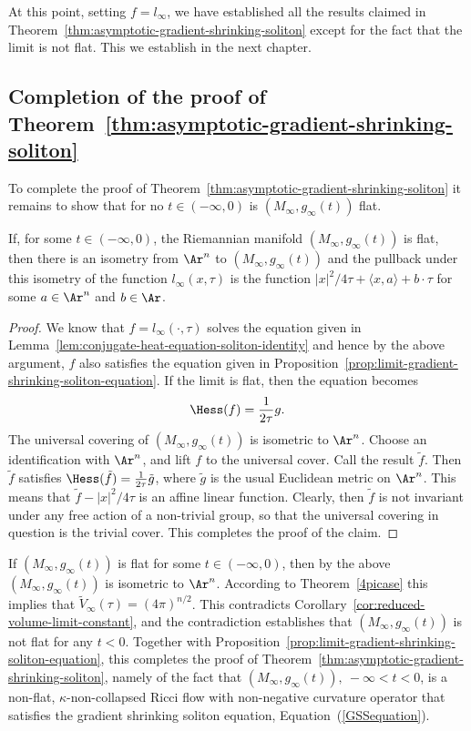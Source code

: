 At this point, setting $f=l_\infty$, we have established all the
results claimed in Theorem~\ref{thm:asymptotic-gradient-shrinking-soliton} except for the fact that
the limit is not flat. This we establish in the next chapter.


\subsection{Completion of the proof of
Theorem~{\ref{thm:asymptotic-gradient-shrinking-soliton}}}

 To complete the
proof of Theorem~\ref{thm:asymptotic-gradient-shrinking-soliton} it remains to show that for no $t\in
(-\infty,0)$ is $(M_\infty,g_\infty(t))$ flat.

\begin{claim}\label{claim:flat-limit-length-function-form}
If, for some $t\in (-\infty,0)$, the Riemannian manifold
$(M_\infty,g_\infty(t))$ is flat, then there is an isometry from
$\Ar^n$ to $(M_\infty,g_\infty(t))$  and the pullback under this
isometry of the function $l_\infty(x,\tau)$ is the function
$|x|^2/4\tau+\langle x,a\rangle+b\cdot \tau$ for some $a\in \Ar^n$
and $b\in \Ar$.
\end{claim}

\begin{proof}
We know that $f=l_\infty(\cdot,\tau)$ solves the equation given in
Lemma~\ref{lem:conjugate-heat-equation-soliton-identity} and hence by the above argument, $f$ also satisfies
the equation given in  Proposition~\ref{prop:limit-gradient-shrinking-soliton-equation}. If the limit is
flat, then the equation becomes
$$\Hess(f)=\frac{1}{2\tau}g.$$ The universal covering of $(M_\infty,g_\infty(t))$
is isometric to $\Ar^n$. Choose an identification with $\Ar^n$, and lift $f$ to
the universal cover. Call the result $\tilde f$. Then $\tilde f$ satisfies
$\Hess(\tilde f)=\frac{1}{2\tau}\tilde g$, where $\tilde g$ is the usual
Euclidean metric on $\Ar^n$. This means that $\tilde f-|x|^2/4\tau$ is an
affine linear function. Clearly, then $\tilde f$ is not invariant under any
free action of a non-trivial group, so that the universal covering in question
is the trivial cover. This completes the proof of the claim.
\end{proof}

If $(M_\infty,g_\infty(t))$ is flat for some $t\in (-\infty,0)$, then by the
above $(M_\infty,g_\infty(t))$ is isometric to $\Ar^n$. According to
Theorem~\ref{4picase} this implies that $\widetilde
V_\infty(\tau)=(4\pi)^{n/2}$. This contradicts Corollary~\ref{cor:reduced-volume-limit-constant}, and
the contradiction establishes that $(M_\infty,g_\infty(t))$ is not flat for any
$t<0$.  Together with Proposition~\ref{prop:limit-gradient-shrinking-soliton-equation}, this completes the proof of
Theorem~\ref{thm:asymptotic-gradient-shrinking-soliton}, namely of the fact that $(M_\infty,g_\infty(t)),\
-\infty<t<0$, is a non-flat, $\kappa$-non-collapsed Ricci flow with
non-negative curvature operator that satisfies the gradient shrinking soliton
equation, Equation~(\ref{GSSequation}).

